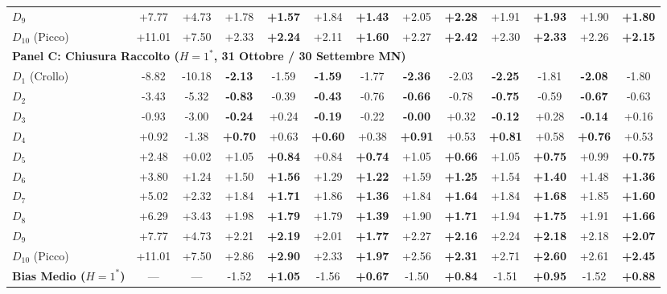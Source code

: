 \begin{table}[H]
\begin{tabular*}{\textwidth}{@{\extracolsep{\fill}} l cc cc cc cc cc cc @{}}
$D_{9}$ & +7.77 & +4.73 & +1.78 & \textbf{+1.57} & +1.84 & \textbf{+1.43} & +2.05 & \textbf{+2.28} & +1.91 & \textbf{+1.93} & +1.90 & \textbf{+1.80} \\
$D_{10}$ (Picco) & +11.01 & +7.50 & +2.33 & \textbf{+2.24} & +2.11 & \textbf{+1.60} & +2.27 & \textbf{+2.42} & +2.30 & \textbf{+2.33} & +2.26 & \textbf{+2.15} \\
\midrule
\multicolumn{13}{l}{\textbf{Panel C: Chiusura Raccolto ($H=1^*$, 31 Ottobre / 30 Settembre MN)}} \\
\midrule
$D_{1}$ (Crollo) & -8.82 & -10.18 & \textbf{-2.13} & -1.59 & \textbf{-1.59} & -1.77 & \textbf{-2.36} & -2.03 & \textbf{-2.25} & -1.81 & \textbf{-2.08} & -1.80 \\
$D_{2}$ & -3.43 & -5.32 & \textbf{-0.83} & -0.39 & \textbf{-0.43} & -0.76 & \textbf{-0.66} & -0.78 & \textbf{-0.75} & -0.59 & \textbf{-0.67} & -0.63 \\
$D_{3}$ & -0.93 & -3.00 & \textbf{-0.24} & +0.24 & \textbf{-0.19} & -0.22 & \textbf{-0.00} & +0.32 & \textbf{-0.12} & +0.28 & \textbf{-0.14} & +0.16 \\
$D_{4}$ & +0.92 & -1.38 & \textbf{+0.70} & +0.63 & \textbf{+0.60} & +0.38 & \textbf{+0.91} & +0.53 & \textbf{+0.81} & +0.58 & \textbf{+0.76} & +0.53 \\
$D_{5}$ & +2.48 & +0.02 & +1.05 & \textbf{+0.84} & +0.84 & \textbf{+0.74} & +1.05 & \textbf{+0.66} & +1.05 & \textbf{+0.75} & +0.99 & \textbf{+0.75} \\
$D_{6}$ & +3.80 & +1.24 & +1.50 & \textbf{+1.56} & +1.29 & \textbf{+1.22} & +1.59 & \textbf{+1.25} & +1.54 & \textbf{+1.40} & +1.48 & \textbf{+1.36} \\
$D_{7}$ & +5.02 & +2.32 & +1.84 & \textbf{+1.71} & +1.86 & \textbf{+1.36} & +1.84 & \textbf{+1.64} & +1.84 & \textbf{+1.68} & +1.85 & \textbf{+1.60} \\
$D_{8}$ & +6.29 & +3.43 & +1.98 & \textbf{+1.79} & +1.79 & \textbf{+1.39} & +1.90 & \textbf{+1.71} & +1.94 & \textbf{+1.75} & +1.91 & \textbf{+1.66} \\
$D_{9}$ & +7.77 & +4.73 & +2.21 & \textbf{+2.19} & +2.01 & \textbf{+1.77} & +2.27 & \textbf{+2.16} & +2.24 & \textbf{+2.18} & +2.18 & \textbf{+2.07} \\
$D_{10}$ (Picco) & +11.01 & +7.50 & +2.86 & \textbf{+2.90} & +2.33 & \textbf{+1.97} & +2.56 & \textbf{+2.31} & +2.71 & \textbf{+2.60} & +2.61 & \textbf{+2.45} \\
\midrule
\textbf{Bias Medio ($H=1^*$)} & --- & --- & -1.52 & \textbf{+1.05} & -1.56 & \textbf{+0.67} & -1.50 & \textbf{+0.84} & -1.51 & \textbf{+0.95} & -1.52 & \textbf{+0.88} \\

\end{tabular*}
\end{table}
